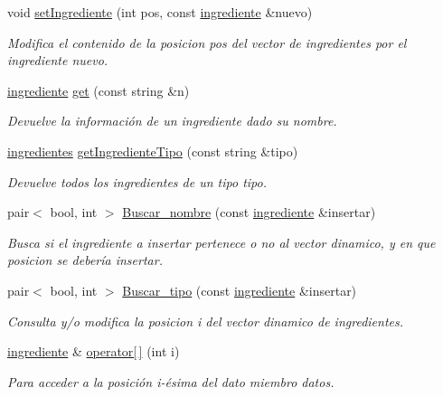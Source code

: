 \begin{DoxyCompactItemize}
void \hyperlink{classingredientes_a8233a658023175299cd83c0bfa9e5421}{set\+Ingrediente} (int pos, const \hyperlink{classingrediente}{ingrediente} \&nuevo)
\begin{DoxyCompactList}\small\item\em Modifica el contenido de la posicion pos del vector de ingredientes por el ingrediente nuevo. \end{DoxyCompactList}\item 
\hyperlink{classingrediente}{ingrediente} \hyperlink{classingredientes_a88b5117b69d592fff44320ccfab5ce58}{get} (const string \&n)
\begin{DoxyCompactList}\small\item\em Devuelve la información de un ingrediente dado su nombre. \end{DoxyCompactList}\item 
\hyperlink{classingredientes}{ingredientes} \hyperlink{classingredientes_a199783a93628a846e8d0b568b06fe3d4}{get\+Ingrediente\+Tipo} (const string \&tipo)
\begin{DoxyCompactList}\small\item\em Devuelve todos los ingredientes de un tipo tipo. \end{DoxyCompactList}\item 
pair$<$ bool, int $>$ \hyperlink{classingredientes_a5a2723852db946495aca5f70c81f5fb9}{Buscar\+\_\+nombre} (const \hyperlink{classingrediente}{ingrediente} \&insertar)
\begin{DoxyCompactList}\small\item\em Busca si el ingrediente a insertar pertenece o no al vector dinamico, y en que posicion se debería insertar. \end{DoxyCompactList}\item 
pair$<$ bool, int $>$ \hyperlink{classingredientes_a3427d84b6e0df98bdbe17e5d1c3791ab}{Buscar\+\_\+tipo} (const \hyperlink{classingrediente}{ingrediente} \&insertar)
\begin{DoxyCompactList}\small\item\em Consulta y/o modifica la posicion i del vector dinamico de ingredientes. \end{DoxyCompactList}\item 
\hyperlink{classingrediente}{ingrediente} \& \hyperlink{classingredientes_a9e099786f83d0ac3cf38317b194691db}{operator\mbox{[}$\,$\mbox{]}} (int i)
\begin{DoxyCompactList}\small\item\em Para acceder a la posición i-\/ésima del dato miembro datos. \end{DoxyCompactList}\item 

\end{DoxyCompactItemize}
